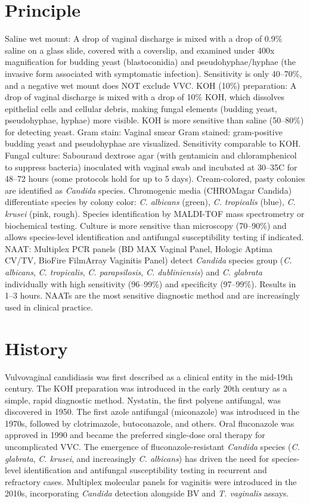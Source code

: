 \section*{Principle}
Saline wet mount: A drop of vaginal discharge is mixed with a drop of 0.9\% saline on a glass slide, covered with a coverslip, and examined under 400x magnification for budding yeast (blastoconidia) and pseudohyphae/hyphae (the invasive form associated with symptomatic infection). Sensitivity is only 40--70\%, and a negative wet mount does NOT exclude VVC. KOH (10\%) preparation: A drop of vaginal discharge is mixed with a drop of 10\% KOH, which dissolves epithelial cells and cellular debris, making fungal elements (budding yeast, pseudohyphae, hyphae) more visible. KOH is more sensitive than saline (50--80\%) for detecting yeast. Gram stain: Vaginal smear Gram stained: gram-positive budding yeast and pseudohyphae are visualized. Sensitivity comparable to KOH. Fungal culture: Sabouraud dextrose agar (with gentamicin and chloramphenicol to suppress bacteria) inoculated with vaginal swab and incubated at 30--35\textdegree{}C for 48--72 hours (some protocols hold for up to 5 days). Cream-colored, pasty colonies are identified as \textit{Candida} species. Chromogenic media (CHROMagar Candida) differentiate species by colony color: \textit{C. albicans} (green), \textit{C. tropicalis} (blue), \textit{C. krusei} (pink, rough). Species identification by MALDI-TOF mass spectrometry or biochemical testing. Culture is more sensitive than microscopy (70--90\%) and allows species-level identification and antifungal susceptibility testing if indicated. NAAT: Multiplex PCR panels (BD MAX Vaginal Panel, Hologic Aptima CV/TV, BioFire FilmArray Vaginitis Panel) detect \textit{Candida} species group (\textit{C. albicans}, \textit{C. tropicalis}, \textit{C. parapsilosis}, \textit{C. dubliniensis}) and \textit{C. glabrata} individually with high sensitivity (96--99\%) and specificity (97--99\%). Results in 1--3 hours. NAATs are the most sensitive diagnostic method and are increasingly used in clinical practice.

\section*{History}
Vulvovaginal candidiasis was first described as a clinical entity in the mid-19th century. The KOH preparation was introduced in the early 20th century as a simple, rapid diagnostic method. Nystatin, the first polyene antifungal, was discovered in 1950. The first azole antifungal (miconazole) was introduced in the 1970s, followed by clotrimazole, butoconazole, and others. Oral fluconazole was approved in 1990 and became the preferred single-dose oral therapy for uncomplicated VVC. The emergence of fluconazole-resistant \textit{Candida} species (\textit{C. glabrata}, \textit{C. krusei}, and increasingly \textit{C. albicans}) has driven the need for species-level identification and antifungal susceptibility testing in recurrent and refractory cases. Multiplex molecular panels for vaginitis were introduced in the 2010s, incorporating \textit{Candida} detection alongside BV and \textit{T. vaginalis} assays.

